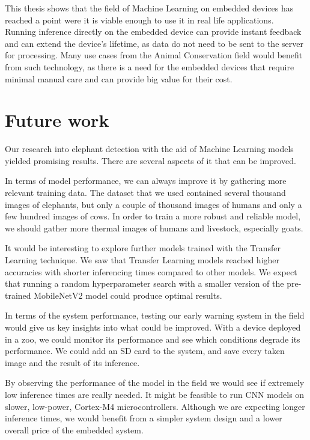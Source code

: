 This thesis shows that the field of Machine Learning on embedded devices has reached a point were it is viable enough to use it in real life applications.
Running inference directly on the embedded device can provide instant feedback and can extend the device's lifetime, as data do not need to be sent to the server for processing.
Many use cases from the Animal Conservation field would benefit from such technology, as there is a need for the embedded devices that require minimal manual care and can provide big value for their cost.


\section{ Future work}

Our research into elephant detection with the aid of Machine Learning models yielded promising results.
There are several aspects of it that can be improved.

In terms of model performance, we can always improve it by gathering more relevant training data.
The dataset that we used contained several thousand images of elephants, but only a couple of thousand images of humans and only a few hundred images of cows.
In order to train a more robust and reliable model, we should gather more thermal images of humans and livestock, especially goats.

It would be interesting to explore further models trained with the Transfer Learning technique.
We saw that Transfer Learning models reached higher accuracies with shorter inferencing times compared to other models.
We expect that running a random hyperparameter search with a smaller version of the pre-trained MobileNetV2 model could produce optimal results.

In terms of the system performance, testing our early warning system in the field would give us key insights into what could be improved.
With a device deployed in a zoo, we could monitor its performance and see which conditions degrade its performance.
We could add an SD card to the system, and save every taken image and the result of its inference.

By observing the performance of the model in the field we would see if extremely low inference times are really needed.
It might be feasible to run CNN models on slower, low-power, Cortex-M4 microcontrollers.
Although we are expecting longer inference times, we would benefit from a simpler system design and a lower overall price of the embedded system.

